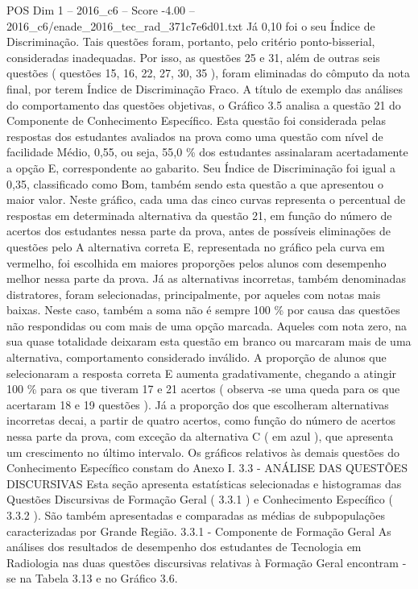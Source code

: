 \begin{textsample}{POS Dim 1 – 2016\_c6 – Score -4.00 – 2016\_c6/enade\_2016\_tec\_rad\_371c7e6d01.txt}
Já 0,10 foi o seu Índice de Discriminação.
Tais questões foram, portanto, pelo critério ponto-bisserial, consideradas inadequadas.
Por isso, as questões 25 e 31, além de outras seis questões ( questões 15, 16, 22, 27, 30, 35 ), foram eliminadas do cômputo da nota final, por terem Índice de Discriminação Fraco.
A título de exemplo das análises do comportamento das questões objetivas, o Gráfico 3.5 analisa a questão 21 do Componente de Conhecimento Específico.
Esta questão foi considerada pelas respostas dos estudantes avaliados na prova como uma questão com nível de facilidade Médio, 0,55, ou seja, 55,0 \% dos estudantes assinalaram acertadamente a opção E, correspondente ao gabarito.
Seu Índice de Discriminação foi igual a 0,35, classificado como Bom, também sendo esta questão a que apresentou o maior valor.
Neste gráfico, cada uma das cinco curvas representa o percentual de respostas em determinada alternativa da questão 21, em função do número de acertos dos estudantes nessa parte da prova, antes de possíveis eliminações de questões pelo A alternativa correta E, representada no gráfico pela curva em vermelho, foi escolhida em maiores proporções pelos alunos com desempenho melhor nessa parte da prova.
Já as alternativas incorretas, também denominadas distratores, foram selecionadas, principalmente, por aqueles com notas mais baixas.
Neste caso, também a soma não é sempre 100 \% por causa das questões não respondidas ou com mais de uma opção marcada.
Aqueles com nota zero, na sua quase totalidade deixaram esta questão em branco ou marcaram mais de uma alternativa, comportamento considerado inválido.
A proporção de alunos que selecionaram a resposta correta E aumenta gradativamente, chegando a atingir 100 \% para os que tiveram 17 e 21 acertos ( observa -se uma queda para os que acertaram 18 e 19 questões ).
Já a proporção dos que escolheram alternativas incorretas decai, a partir de quatro acertos, como função do número de acertos nessa parte da prova, com exceção da alternativa C ( em azul ), que apresenta um crescimento no último intervalo.
Os gráficos relativos às demais questões do Conhecimento Específico constam do Anexo I. 3.3 - ANÁLISE DAS QUESTÕES DISCURSIVAS Esta seção apresenta estatísticas selecionadas e histogramas das Questões Discursivas de Formação Geral ( 3.3.1 ) e Conhecimento Específico ( 3.3.2 ).
São também apresentadas e comparadas as médias de subpopulações caracterizadas por Grande Região. 3.3.1 - Componente de Formação Geral As análises dos resultados de desempenho dos estudantes de Tecnologia em Radiologia nas duas questões discursivas relativas à Formação Geral encontram -se na Tabela 3.13 e no Gráfico 3.6.

\end{textsample}
